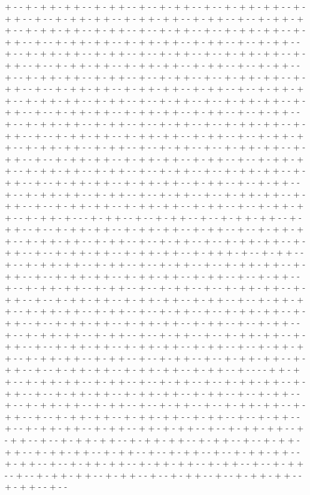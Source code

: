 + - - + - + + - + + - - + - + + - - + - - + - + + - - + - - + - + + - + + - - + - + + - - + - - + - + + - + + - - + - + + - + + - - + - + + - - + - - + - + + - + + - - + - + + - + + - - + - + + - - + - - + - + + - - + - - + - + + - + + - - + - + + - - + - - + - + + - + + - - + - + + - + + - - + - + + - - + - - + - + + - - + - - + - + + - + + - - + - + + - - + - - + - + + - - + - - + - + + - + + - - + - + + - - + - - + - + + - + + - - + - + + - + + - - + - + + - - + - - + - + + - - + - - + - + + - + + - - + - + + - - + - - + - + + - - + - - + - + + - + + - - + - + + - - + - - + - + + - + + - - + - + + - + + - - + - + + - - + - - + - + + - + + - - + - + + - + + - - + - + + - - + - - + - + + - - + - - + - + + - + + - - + - + + - - + - - + - + + - + + - - + - + + - + + - - + - + + - - + - - + - + + - - + - - + - + + - + + - - + - + + - - + - - + - + + - - + - - + - + + - + + - - + - + + - - + - - + - + + - + + - - + - + + - + + - - + - + + - - + - - + - + + - + + - - + - + + - + + - - + - + + - - + - - + - + + - - + - - + - + + - + + - - + - + + - - + - - + - + + - + + - - + - + + - + + - - + - + + - - + - - + - + + - + + - - + - + + - + + - - + - + + - - + - - + - + + - - + - - + - + + - + + - - + - + + - - + - - + - + + - + + - - + - + + - + + - - + - + + - - + - - + - + + - - + - - + - + + - + + - - + - + + - - + - - + - + + - - + - - + - + + - + + - - + - + + - - + - - + - + + - + + - - + - + + - + + - - + - + + - - + - - + - + + - + + - - + - + + - + - - - + - + + - - + - - + - + + - - + - - + - + + - + + - - + - + + - - + - - + - + + - + + - - + - + + - + + - - + - + + - - + - - + - + + - + + - - + - + + - + + - - + - + + - - + - - + - + + - - + - - + - + + - + + - - + - + + - - + - - + - + + - + + - - + - + + - + + - - + - + + + - + - - + - + + - - + - - + - + + - + + - - + - + + - - + - - + - + + - - + - - + - + + - + + - - + - + + - - + - - + - + + - + + - - + - + + - + + - - + - + + - - + - - + - + + - - + - - + - + + - + + - - + - + + - - + - - + - + + - - + - - + - + + - + + - - + - + + - - + - - + - + + - + + - - + - + + - + + - - + - + + - - + - - + - + + - + + - - + - + + - + + - - + - + + - - + - - + - + + - - + - - + - + + - + + - - + - + + - - + - - + - + + - + + - - + - + + - + + - - + - + + - - + - - + - + + - - + - - + - + + - + + - - + - + + - - + - - + - + + - - + - - + - + + - + + - - + - + + - - + - - + - + + - + + - - + - + + - + + - - + - + + - - + - - + - + + - + + - - + - + + - + + - - + - + + - - + - - + - + + - - + - - + - + + - + + - - + - + + - - + - - + - + + - + + - - + - + + - + + - - + - + + - - + - - - - + + - + + - - + - + + - + + - - + - + + - - + - - + - + + - - + - - + - + + - + + - - + - + + - - + - - + - + + - + + - - + - + + - + + - - + - + + - - + - - + - + + - - + - - + - + + - + + - - + - + + - - + - - + - + + - - + - - + - + + - + + - - + - + + - - + - - + - + + - + + - - + - + + - + + - - + - + + - - + - - + - + + - - + - - + - + + - + + - - + - + + - - + + - + - + + - - + - - + - + + - + + - - + - + + - - + - - + - + + - + + - - + - + + - + + - - + - + + - - + - - + - + + - + + - - + - + + - + + - - + - + + - - + - - + - + + - - + - - + - + + - + + - - + - + + - - + - - + - + + - + + - - + - + + - + + - - + - + + - - + - - + - + + - - + - - + - + + - + + - - + - + + - - + - - + - + + - - + - - + - + + - + + - - + - + + - - + - - 